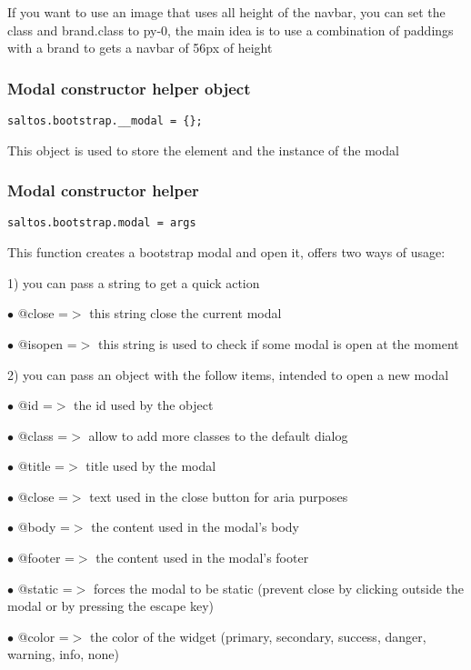 \documentclass[a4paper]{article}
\begin{document}
If you want to use an image that uses all height of the navbar, you can set the class and
brand.class to py-0, the main idea is to use a combination of paddings with a brand to
gets a navbar of 56px of height

\hypertarget{toc662}{}
\subsubsection{Modal constructor helper object}

\begin{lstlisting}
saltos.bootstrap.__modal = {};
\end{lstlisting}

This object is used to store the element and the instance of the modal

\hypertarget{toc663}{}
\subsubsection{Modal constructor helper}

\begin{lstlisting}
saltos.bootstrap.modal = args
\end{lstlisting}

This function creates a bootstrap modal and open it, offers two ways of usage:

1) you can pass a string to get a quick action

\begin{compactitem}
\item[\color{myblue}$\bullet$] @close   =$>$ this string close the current modal
\item[\color{myblue}$\bullet$] @isopen  =$>$ this string is used to check if some modal is open at the moment
\end{compactitem}

2) you can pass an object with the follow items, intended to open a new modal

\begin{compactitem}
\item[\color{myblue}$\bullet$] @id      =$>$ the id used by the object
\item[\color{myblue}$\bullet$] @class   =$>$ allow to add more classes to the default dialog
\item[\color{myblue}$\bullet$] @title   =$>$ title used by the modal
\item[\color{myblue}$\bullet$] @close   =$>$ text used in the close button for aria purposes
\item[\color{myblue}$\bullet$] @body    =$>$ the content used in the modal's body
\item[\color{myblue}$\bullet$] @footer  =$>$ the content used in the modal's footer
\item[\color{myblue}$\bullet$] @static  =$>$ forces the modal to be static (prevent close by clicking outside the modal or
            by pressing the escape key)
\item[\color{myblue}$\bullet$] @color   =$>$ the color of the widget (primary, secondary, success, danger, warning, info, none)
\end{compactitem}
\end{document}
